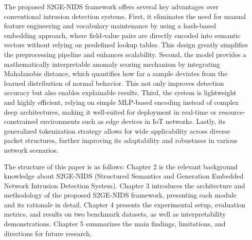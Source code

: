 \begin{ZhChapter}
    The proposed S2GE-NIDS framework offers several key advantages over conventional intrusion detection systems. First, it eliminates the need for manual feature engineering and vocabulary maintenance by using a hash-based embedding approach, where field-value pairs are directly encoded into semantic vectors without relying on predefined lookup tables. This design greatly simplifies the preprocessing pipeline and enhances scalability. Second, the model provides a mathematically interpretable anomaly scoring mechanism by integrating Mahalanobis distance, which quantifies how far a sample deviates from the learned distribution of normal behavior. This not only improves detection accuracy but also enables explainable results. Third, the system is lightweight and highly efficient, relying on simple MLP-based encoding instead of complex deep architectures, making it well-suited for deployment in real-time or resource-constrained environments such as edge devices in IoT networks. Lastly, its generalized tokenization strategy allows for wide applicability across diverse packet structures, further improving its adaptability and robustness in various network scenarios.

    The structure of this paper is as follows: Chapter 2 is the relevant background knowledge about S2GE-NIDS (Structured Semantics and Generation Embedded Network Intrusion Detection System). Chapter 3 introduces the architecture and methodology of the proposed S2GE-NIDS framework, presenting each module and its rationale in detail. Chapter 4 presents the experimental setup, evaluation metrics, and results on two benchmark datasets, as well as interpretability demonstrations. Chapter 5 summarizes the main findings, limitations, and directions for future research.
      
    

\end{ZhChapter}